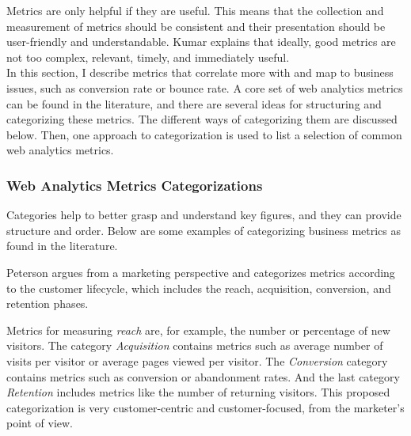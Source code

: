

Metrics are only helpful if they are useful.
This means that the collection and measurement of metrics should be consistent and their presentation should be user-friendly and understandable. %
Kumar explains that ideally, good metrics are not too complex, relevant, timely, and immediately useful.  \\%





In this section, I describe metrics that correlate more with and map to business issues, such as conversion rate or bounce rate.
A core set of web analytics metrics can be found in the literature, and there are several ideas for structuring and categorizing these metrics.
The different ways of categorizing them are discussed below.
Then, one approach to categorization is used to list a selection of common web analytics metrics.



\subsubsection{Web Analytics Metrics Categorizations} %

Categories help to better grasp and understand key figures, and they can provide structure and order.
Below are some examples of categorizing business metrics as found in the literature.

Peterson argues from a marketing perspective and categorizes metrics according to the customer lifecycle, which includes the reach, acquisition, conversion, and retention phases. %

Metrics for measuring \textit{reach} are, for example, the number or percentage of new visitors.
The category \textit{Acquisition} contains metrics such as average number of visits per visitor or average pages viewed per visitor.
The \textit{Conversion} category contains metrics such as conversion or abandonment rates.
And the last category \textit{Retention} includes metrics like the number of returning visitors.
This proposed categorization is very customer-centric and customer-focused, from the marketer's point of view. 


